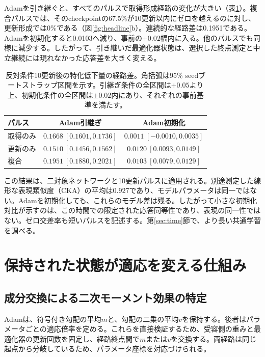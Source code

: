 Adamを引き継ぐと、すべてのパルスで取得形成経路の変化が大きい（表\ref{tab:pulses}）。複合パルスでは、そのcheckpointの67.5\%が10更新以内にゼロを越えるのに対し、更新形成では0\%である（図\ref{fig:headline}b）。連続的な経路差は0.1951である。Adamを初期化すると0.0103へ減り、事前の$\pm0.02$幅内に入る。他のパルスでも同様に減少する。したがって、引き継いだ最適化器状態は、選択した終点測定と中立継続には現れなかった応答差を大きく変える。

\begin{table}[t]
\centering\small
\caption{反対条件10更新後の特化低下量の経路差。角括弧は95\% seedブートストラップ区間を示す。引継ぎ条件の全区間は$+0.05$より上、初期化条件の全区間は$\pm0.02$内にあり、それぞれの事前基準を満たす。}
\label{tab:pulses}
\begin{tabular}{lcc}
\toprule
パルス & Adam引継ぎ & Adam初期化\\
\midrule
取得のみ & $0.1668\ [0.1601,0.1736]$ & $0.0011\ [-0.0010,0.0035]$\\
更新のみ & $0.1510\ [0.1456,0.1562]$ & $0.0120\ [0.0093,0.0149]$\\
複合 & $0.1951\ [0.1880,0.2021]$ & $0.0103\ [0.0079,0.0129]$\\
\bottomrule
\end{tabular}
\end{table}

この結果は、二対象ネットワークと10更新パルスに適用される。別途測定した線形な表現類似度（CKA）の平均は0.927であり、モデルパラメータは同一ではない。Adamを初期化しても、これらのモデル差は残る。したがって小さな初期化対比が示すのは、この時間での限定された応答同等性であり、表現の同一性ではない。ゼロ交差率も短いパルスを記述する。第\ref{sec:time}節で、より長い共通学習を調べる。

\section{保持された状態が適応を変える仕組み}
\label{sec:mechanism}
\subsection{成分交換による二次モーメント効果の特定}
Adamは、符号付き勾配の平均$m$と、勾配の二乗の平均$v$を保持する\citep{kingma2015adam}。後者はパラメータごとの適応倍率を定める。これらを直接検証するため、受容側の重みと最適化器の更新回数を固定し、経路終点間で$m$または$v$を交換する。両経路は同じ起点から分岐しているため、パラメータ座標を対応づけられる。


